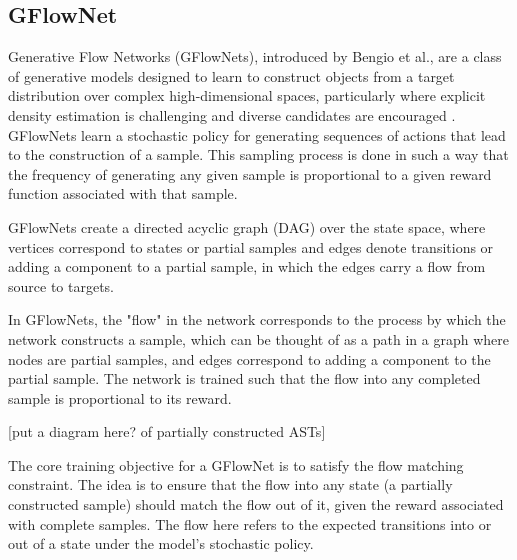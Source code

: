 \subsection{GFlowNet}






Generative Flow Networks (GFlowNets), introduced by Bengio et al., are a class of generative models designed to learn to construct objects from a target distribution over complex high-dimensional spaces, particularly where explicit density estimation is challenging and diverse candidates are encouraged \cite{bengio_flow_2021}. GFlowNets learn a stochastic policy for generating sequences of actions that lead to the construction of a sample. This sampling process is done in such a way that the frequency of generating any given sample is proportional to a given reward function associated with that sample.

GFlowNets create a directed acyclic graph (DAG) over the state space, where vertices correspond to states or partial samples and edges denote transitions or adding a component to a partial sample, in which the edges carry a flow from source to targets.

In GFlowNets, the "flow" in the network corresponds to the process by which the network constructs a sample, which can be thought of as a path in a graph where nodes are partial samples, and edges correspond to adding a component to the partial sample. The network is trained such that the flow into any completed sample is proportional to its reward.

[put a diagram here? of partially constructed ASTs]

The core training objective for a GFlowNet is to satisfy the flow matching constraint. The idea is to ensure that the flow into any state (a partially constructed sample) should match the flow out of it, given the reward associated with complete samples. The flow here refers to the expected transitions into or out of a state under the model's stochastic policy. 

